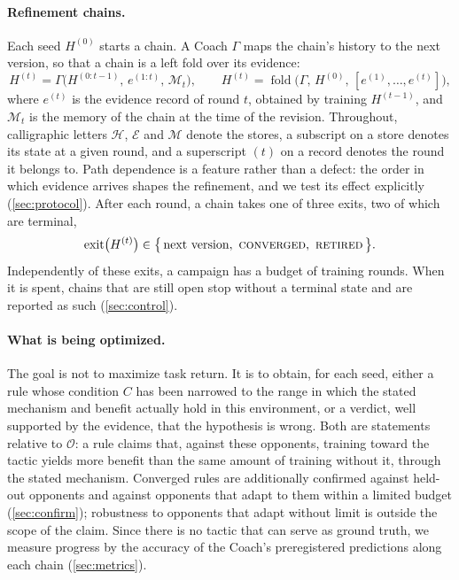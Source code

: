 \documentclass[11pt]{article}
\newcommand{\Hst}{\mathcal{H}}           %
\newcommand{\Est}{\mathcal{E}}           %
\newcommand{\Mst}{\mathcal{M}}           %
\newcommand{\opp}{\mathcal{O}}           %
\begin{document}
\paragraph{Refinement chains.}
Each seed $H^{(0)}$ starts a chain.
A Coach $\Gamma$ maps the chain's history to the next version, so that a chain is a left fold over its evidence:
\begin{equation}
  H^{(t)} = \Gamma\bigl(H^{(0:t-1)},\, e^{(1:t)},\, \Mst_t\bigr),
  \qquad
  H^{(t)} = \operatorname{fold}\bigl(\Gamma,\, H^{(0)},\, [e^{(1)},\dots,e^{(t)}]\bigr),
\end{equation}
where $e^{(t)}$ is the evidence record of round $t$, obtained by training $H^{(t-1)}$, and $\Mst_t$ is the memory of the chain at the time of the revision.
Throughout, calligraphic letters $\Hst$, $\Est$ and $\Mst$ denote the stores, a subscript on a store denotes its state at a given round, and a superscript $(t)$ on a record denotes the round it belongs to.
Path dependence is a feature rather than a defect: the order in which evidence arrives shapes the refinement, and we test its effect explicitly (\cref{sec:protocol}).
After each round, a chain takes one of three exits, two of which are terminal,
\begin{equation}
  \text{exit}\bigl(H^{(t)}\bigr) \in \bigl\{\, \text{next version},\ \textsc{converged},\ \textsc{retired} \,\bigr\}.
\end{equation}
Independently of these exits, a campaign has a budget of training rounds.
When it is spent, chains that are still open stop without a terminal state and are reported as such (\cref{sec:control}).

\paragraph{What is being optimized.}
The goal is not to maximize task return.
It is to obtain, for each seed, either a rule whose condition $C$ has been narrowed to the range in which the stated mechanism and benefit actually hold in this environment, or a verdict, well supported by the evidence, that the hypothesis is wrong.
Both are statements relative to $\opp$: a rule claims that, against these opponents, training toward the tactic yields more benefit than the same amount of training without it, through the stated mechanism.
Converged rules are additionally confirmed against held-out opponents and against opponents that adapt to them within a limited budget (\cref{sec:confirm}); robustness to opponents that adapt without limit is outside the scope of the claim.
Since there is no tactic that can serve as ground truth, we measure progress by the accuracy of the Coach's preregistered predictions along each chain (\cref{sec:metrics}).
\end{document}
